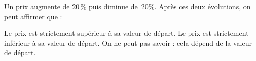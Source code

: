 
Un prix augmente de $20\,\%$ puis diminue de $\,20\%$. Après ces deux évolutions, on peut affirmer que :

\smallskip

%
{Le prix est strictement supérieur à sa valeur de départ.}%
{Le prix est strictement inférieur à sa valeur de départ.}%
{On ne peut pas savoir : cela dépend de la valeur de départ.}
